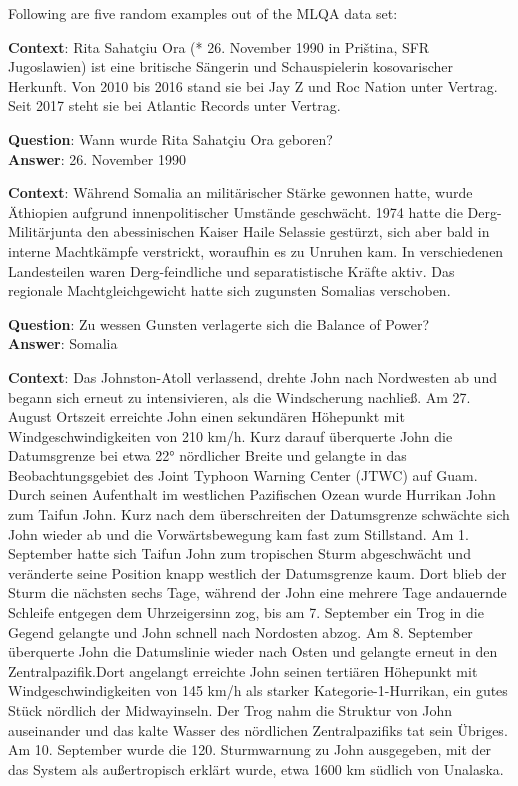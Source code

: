 Following are five random examples out of the MLQA data set:

\begin{examples}
  \item \textbf{Context}:
        Rita Sahatçiu Ora (* 26. November 1990 in Priština, SFR Jugoslawien) ist
        eine britische Sängerin und Schauspielerin kosovarischer Herkunft. Von 2010 bis 2016 stand
        sie bei Jay Z und Roc Nation unter Vertrag. Seit 2017 steht sie bei Atlantic Records unter Vertrag.

        \textbf{Question}: Wann wurde Rita Sahatçiu Ora geboren?\\
        \textbf{Answer}: 26. November 1990
  \item \textbf{Context}:
        Während Somalia an militärischer Stärke gewonnen hatte, wurde Äthiopien aufgrund innenpolitischer
        Umstände geschwächt. 1974 hatte die Derg-Militärjunta den abessinischen Kaiser Haile Selassie
        gestürzt, sich aber bald in interne Machtkämpfe verstrickt, woraufhin es zu Unruhen kam. In
        verschiedenen Landesteilen waren Derg-feindliche und separatistische Kräfte aktiv. Das regionale
        Machtgleichgewicht hatte sich zugunsten Somalias verschoben.

      \textbf{Question}: Zu wessen Gunsten verlagerte sich die Balance of Power?\\
      \textbf{Answer}: Somalia
  \item \label{itm:mlqa-strange-answer-span} \textbf{Context}:
        Das Johnston-Atoll verlassend, drehte John nach Nordwesten ab und begann sich erneut zu
        intensivieren, als die Windscherung nachließ. Am 27. August Ortszeit erreichte John einen
        sekundären Höhepunkt mit Windgeschwindigkeiten von 210 km/h. Kurz darauf überquerte John
        die Datumsgrenze bei etwa 22° nördlicher Breite und gelangte in das Beobachtungsgebiet
        des Joint Typhoon Warning Center (JTWC) auf Guam. Durch seinen Aufenthalt im westlichen
        Pazifischen Ozean wurde Hurrikan John zum Taifun John. Kurz nach dem überschreiten
        der Datumsgrenze schwächte sich John wieder ab und die Vorwärtsbewegung kam fast zum
        Stillstand. Am 1. September hatte sich Taifun John zum tropischen Sturm abgeschwächt und
        veränderte seine Position knapp westlich der Datumsgrenze kaum. Dort blieb der Sturm die
        nächsten sechs Tage, während der John eine mehrere Tage andauernde Schleife entgegen dem
        Uhrzeigersinn zog, bis am 7. September ein Trog in die Gegend gelangte und John schnell
        nach Nordosten abzog. Am 8. September überquerte John die Datumslinie wieder nach Osten
        und gelangte erneut in den Zentralpazifik.Dort angelangt erreichte John seinen tertiären
        Höhepunkt mit Windgeschwindigkeiten von 145 km/h als starker Kategorie-1-Hurrikan, ein
        gutes Stück nördlich der Midwayinseln. Der Trog nahm die Struktur von John auseinander
        und das kalte Wasser des nördlichen Zentralpazifiks tat sein Übriges. Am 10. September
        wurde die 120. Sturmwarnung zu John ausgegeben, mit der das System als außertropisch
        erklärt wurde, etwa 1600 km südlich von Unalaska.


\end{examples}
